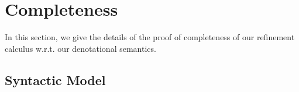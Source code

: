 \documentclass[acmsmall,screen,anonymous,review]{acmart}
\newcounter{todos}
\newcommand{\TODO}[1]{{
  \stepcounter{todos}
  \begin{center}\large{\textcolor{red}{\textbf{TODO \arabic{todos}:} #1}}\end{center}
}}
\begin{document}


\section{Completeness}

\label{apx:completeness}

In this section, we give the details of the proof of completeness of our refinement calculus w.r.t.
our denotational semantics.

\subsection{Syntactic Model}

\label{apx:syn-model}
\end{document}
